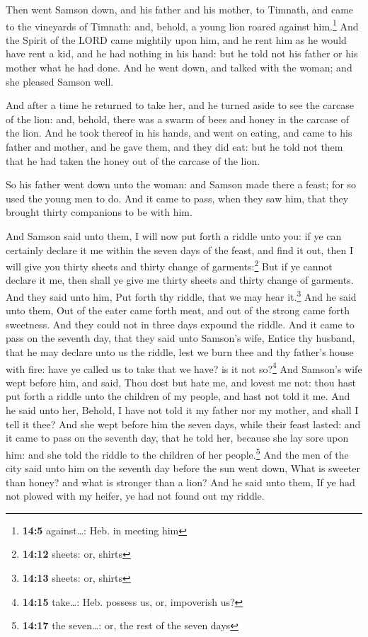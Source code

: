  Then went Samson down, and his father and his mother, to
Timnath, and came to the vineyards of Timnath: and, behold, a young lion
roared against him.\footnote{\textbf{14:5} against\ldots: Heb. in
  meeting him}  And the Spirit of the LORD came mightily
upon him, and he rent him as he would have rent a kid, and he had
nothing in his hand: but he told not his father or his mother what he
had done.  And he went down, and talked with the woman;
and she pleased Samson well.

 And after a time he returned to take her, and he turned
aside to see the carcase of the lion: and, behold, there was a swarm of
bees and honey in the carcase of the lion.  And he took
thereof in his hands, and went on eating, and came to his father and
mother, and he gave them, and they did eat: but he told not them that he
had taken the honey out of the carcase of the lion.

 So his father went down unto the woman: and Samson made
there a feast; for so used the young men to do.  And it
came to pass, when they saw him, that they brought thirty companions to
be with him.

 And Samson said unto them, I will now put forth a riddle
unto you: if ye can certainly declare it me within the seven days of the
feast, and find it out, then I will give you thirty sheets and thirty
change of garments:\footnote{\textbf{14:12} sheets: or, shirts}
 But if ye cannot declare it me, then shall ye give me
thirty sheets and thirty change of garments. And they said unto him, Put
forth thy riddle, that we may hear it.\footnote{\textbf{14:13} sheets:
  or, shirts}  And he said unto them, Out of the eater
came forth meat, and out of the strong came forth sweetness. And they
could not in three days expound the riddle.  And it came
to pass on the seventh day, that they said unto Samson's wife, Entice
thy husband, that he may declare unto us the riddle, lest we burn thee
and thy father's house with fire: have ye called us to take that we
have? is it not so?\footnote{\textbf{14:15} take\ldots: Heb. possess us,
  or, impoverish us?}  And Samson's wife wept before him,
and said, Thou dost but hate me, and lovest me not: thou hast put forth
a riddle unto the children of my people, and hast not told it me. And he
said unto her, Behold, I have not told it my father nor my mother, and
shall I tell it thee?  And she wept before him the seven
days, while their feast lasted: and it came to pass on the seventh day,
that he told her, because she lay sore upon him: and she told the riddle
to the children of her people.\footnote{\textbf{14:17} the seven\ldots:
  or, the rest of the seven days}  And the men of the
city said unto him on the seventh day before the sun went down, What is
sweeter than honey? and what is stronger than a lion? And he said unto
them, If ye had not plowed with my heifer, ye had not found out my
riddle.


